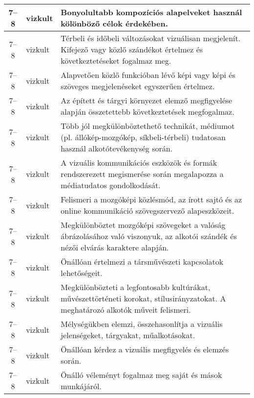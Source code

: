 \begin{small}
\begin{longtable}{c | p{2cm} |  p{11cm} }
              7--8 & vizkult & Bonyolultabb kompozíciós alapelveket használ kölönböző célok érdekében. \\ \hline
              7--8 & vizkult & Térbeli és időbeli változásokat vizuálisan megjelenít. Kifejező vagy közlő szándékot értelmez és következtetéseket fogalmaz meg. \\ \hline
              7--8 & vizkult & Alapvetően közlő funkcióban lévő képi vagy képi és szöveges megjelenéseket egyszerűen értelmez. \\ \hline
              7--8 & vizkult & Az épített és tárgyi környezet elemző megfigyelése alapján összetettebb következtetések megfogalmaz. \\ \hline
              7--8 & vizkult & Több jól megkülönböztethető technikát, médiumot (pl. állókép-mozgókép, síkbeli-térbeli) tudatosan használ alkotótevékenység során. \\ \hline
              7--8 & vizkult & A vizuális kommunikációs eszközök és formák rendszerezett megismerése során megalapozza a médiatudatos gondolkodását. \\ \hline
              7--8 & vizkult & Felismeri a mozgóképi közlésmód, az írott sajtó és az online kommunikáció szövegszervező alapeszközeit. \\ \hline
              7--8 & vizkult & Megkülönböztet mozgóképi szövegeket a valóság ábrázolásához való viszonyuk, az alkotói szándék és nézői elvárás karaktere alapján. \\ \hline
              7--8 & vizkult & Önállóan értelmezi a társművészeti kapcsolatok lehetőségeit. \\ \hline
              7--8 & vizkult & Megkülönbözteti a legfontosabb kultúrákat, művészettörténeti korokat, stílusirányzatokat. A meghatározó alkotók műveit felismeri. \\ \hline
              7--8 & vizkult & Mélységükben elemzi, összehasonlítja a vizuális jelenségeket, tárgyakat, műalkotásokat. \\ \hline
              7--8 & vizkult & Önállóan kérdez a vizuális megfigyelés és elemzés során. \\ \hline
              7--8 & vizkult & Önálló véleményt fogalmaz meg saját és mások munkájáról. \\ \hline
      \end{longtable}
\end{small}


